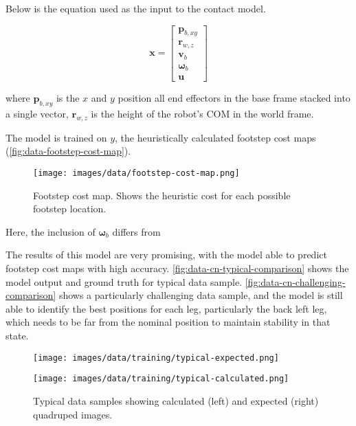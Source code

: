 Below is the equation used as the input to the contact model.

\[
  \mathbf{x} =
  \begin{bmatrix}
    \mathbf p_{b,xy} \\
    \mathbf r_{w,z} \\
    \mathbf v_b \\
    \mathbf \omega_b \\
    \mathbf u
  \end{bmatrix}
\]

where
$\mathbf p_{b,xy}$ is the $x$ and $y$ position all end effectors in
the base frame stacked into a single vector,
$\mathbf r_{w,z}$ is the height of the robot's COM in the world frame.

The model is trained on $y$, the heuristically calculated footstep
cost maps (\autoref{fig:data-footstep-cost-map}).

\begin{figure}
  \centering
  \texttt{[image: images/data/footstep-cost-map.png]}
  \caption{Footstep cost map. Shows the heuristic cost for each
  possible footstep location.}
  \label{fig:data-footstep-cost-map}
\end{figure}

Here, the inclusion of $\mathbf \omega_b$ differs from
\cite{bratta_contactnet_2024}

The results of this model are very promising, with the model able to
predict footstep cost maps with high accuracy.
\autoref{fig:data-cn-typical-comparison}
shows the model output and ground truth for typical data sample.
\autoref{fig:data-cn-challenging-comparison}
shows a particularly challenging data sample, and the model is still
able to identify the best positions for each leg,
particularly the back left leg, which needs to be far from the
nominal position to maintain stability in that state.

\begin{figure}
  \centering
  \begin{minipage}[T]{0.45\textwidth}
    \centering
    \texttt{[image: images/data/training/typical-expected.png]}
  \end{minipage}
  \hfill
  \begin{minipage}[T]{0.45\textwidth}
    \centering
    \texttt{[image: images/data/training/typical-calculated.png]}
  \end{minipage}
  \hfill

  \caption{Typical data samples showing calculated (left) and
  expected (right) quadruped images.}
  \label{fig:data-cn-typical-comparison}
\end{figure}

